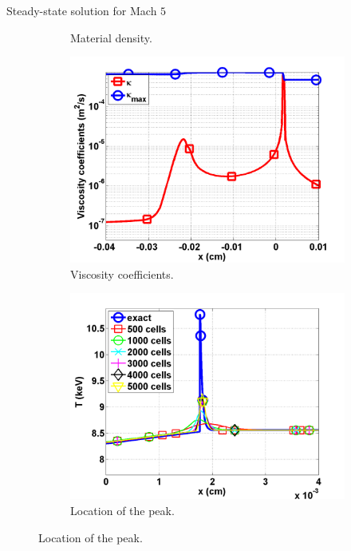 \documentclass[xcolor=dvipsnames,10pt]{beamer}
\begin{document}
\begin{frame}{Steady-state solution for Mach $5$}
\begin{figure}
\begin{subfigure}[b]{0.35\textwidth}
        \caption{Material density.}
\end{subfigure}

\begin{subfigure}[b]{0.35\textwidth}
                \centering
                \includegraphics[width=\textwidth]{../figures/Mach_5_nel_2000_viscosity.png}
        \caption{Viscosity coefficients.}
\end{subfigure}
\begin{subfigure}[b]{0.35\textwidth}
                \centering
                \includegraphics[width=\textwidth]{../figures/Mach_5_comparison.png}
        \caption{Location of the peak.}
\end{subfigure}
\end{figure}
\end{frame}
\end{document}
